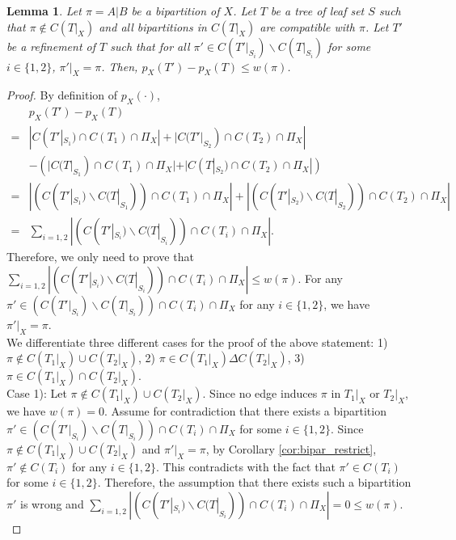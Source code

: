 \documentclass{bmcart}
\newtheorem{lemma}{Lemma}
\begin{document}
\begin{lemma} \label{lem:one_bipar_upperbound}
    Let $\pi = A|B$ be a bipartition of $X$. Let $T$ be a tree of leaf set $S$ such that $\pi \notin C(T|_X)$ and all bipartitions in $C(T|_X)$ are compatible with $\pi$. Let $T'$ be a refinement of $T$ such that for all $\pi' \in C(T'|_{S_i}) \backslash C(T|_{S_i})$ for some $i \in \{1,2\}$, $\pi'|_X = \pi$. Then, $p_X(T') - p_X(T) \le w(\pi)$. 
\end{lemma}
\begin{proof}
    By definition of $p_X(\cdot)$, 
    \begin{align*}
        & p_X(T') - p_X(T) \\
        =& |C(T'|_{S_1}) \cap C(T_1) \cap \Pi_X| + |C(T'|_{S_2}) \cap C(T_2) \cap \Pi_X| \\
        &- (|C(T|_{S_1}) \cap C(T_1) \cap \Pi_X| + |C(T|_{S_2}) \cap C(T_2) \cap \Pi_X|) \\
        =& |(C(T'|_{S_1})\backslash C(T|_{S_1})) \cap C(T_1) \cap \Pi_X|+|(C(T'|_{S_2})\backslash C(T|_{S_2})) \cap C(T_2) \cap \Pi_X|\\
        =& \sum_{i = 1,2}|(C(T'|_{S_i})\backslash C(T|_{S_i})) \cap C(T_i) \cap \Pi_X|.
    \end{align*}
    Therefore, we only need to prove that $\sum_{i = 1,2}|(C(T'|_{S_i})\backslash C(T|_{S_i})) \cap C(T_i) \cap \Pi_X| \le w(\pi)$. For any $\pi' \in (C(T'|_{S_i})\backslash C(T|_{S_i})) \cap C(T_i) \cap \Pi_X$ for any $i \in \{1,2\}$, we have $\pi'|_X = \pi$. \\
    
    We differentiate three different cases for the proof of the above statement: 1) $\pi \notin C(T_1|_X)\cup C(T_2|_X)$, 2) $\pi \in C(T_1|_X) \Delta C(T_2|_X)$, 3) $\pi \in C(T_1|_X) \cap C(T_2|_X)$. \\
    
    Case 1): Let $\pi \notin C(T_1|_X)\cup C(T_2|_X)$. Since no edge induces $\pi$ in $T_1|_X$ or $T_2|_X$, we have $w(\pi) = 0$. Assume for contradiction that there exists a bipartition $\pi'\in (C(T'|_{S_i})\backslash C(T|_{S_i})) \cap C(T_i) \cap \Pi_X$ for some $i \in \{1,2\}$.  Since $\pi \notin C(T_1|_X)\cup C(T_2|_X)$ and $\pi'|_X = \pi$, by Corollary \ref{cor:bipar_restrict}, $\pi' \notin C(T_i)$ for any $i \in \{1,2\}$. This contradicts with the fact that $\pi' \in C(T_i)$ for some $i \in \{1,2\}$. Therefore, the assumption that there exists such a bipartition $\pi'$ is wrong and $\sum_{i = 1,2}|(C(T'|_{S_i})\backslash C(T|_{S_i})) \cap C(T_i) \cap \Pi_X| = 0 \le w(\pi)$.\\
    

\end{proof}
\end{document}
